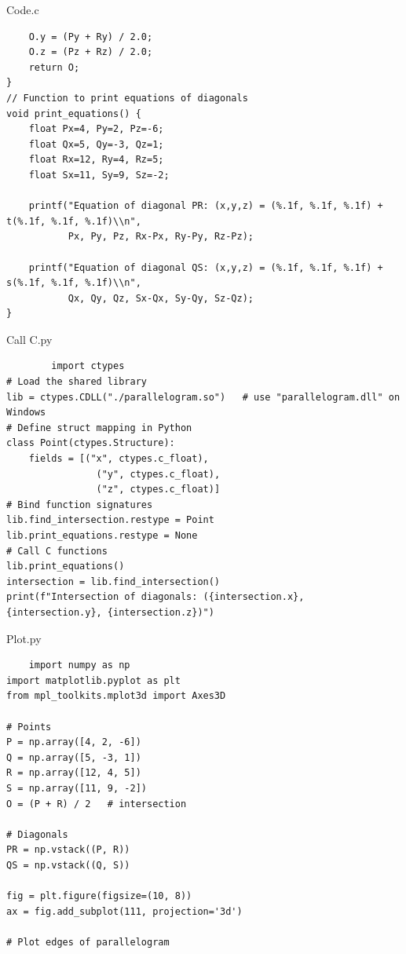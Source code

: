 \documentclass{beamer}
\begin{document}
\begin{frame}[fragile]{Code.c}
    \begin{lstlisting}
    O.y = (Py + Ry) / 2.0;
    O.z = (Pz + Rz) / 2.0;
    return O;
}
// Function to print equations of diagonals
void print_equations() {
    float Px=4, Py=2, Pz=-6;
    float Qx=5, Qy=-3, Qz=1;
    float Rx=12, Ry=4, Rz=5;
    float Sx=11, Sy=9, Sz=-2;

    printf("Equation of diagonal PR: (x,y,z) = (%.1f, %.1f, %.1f) + t(%.1f, %.1f, %.1f)\\n",
           Px, Py, Pz, Rx-Px, Ry-Py, Rz-Pz);

    printf("Equation of diagonal QS: (x,y,z) = (%.1f, %.1f, %.1f) + s(%.1f, %.1f, %.1f)\\n",
           Qx, Qy, Qz, Sx-Qx, Sy-Qy, Sz-Qz);
}
    \end{lstlisting}
\end{frame}

\begin{frame}[fragile]{Call C.py}
    \begin{lstlisting}
        import ctypes
# Load the shared library
lib = ctypes.CDLL("./parallelogram.so")   # use "parallelogram.dll" on Windows
# Define struct mapping in Python
class Point(ctypes.Structure):
    fields = [("x", ctypes.c_float),
                ("y", ctypes.c_float),
                ("z", ctypes.c_float)]
# Bind function signatures
lib.find_intersection.restype = Point
lib.print_equations.restype = None
# Call C functions
lib.print_equations()
intersection = lib.find_intersection()
print(f"Intersection of diagonals: ({intersection.x}, {intersection.y}, {intersection.z})")
    \end{lstlisting}
\end{frame}

\begin{frame}[fragile]{Plot.py}
\begin{lstlisting}
    import numpy as np
import matplotlib.pyplot as plt
from mpl_toolkits.mplot3d import Axes3D

# Points
P = np.array([4, 2, -6])
Q = np.array([5, -3, 1])
R = np.array([12, 4, 5])
S = np.array([11, 9, -2])
O = (P + R) / 2   # intersection

# Diagonals
PR = np.vstack((P, R))
QS = np.vstack((Q, S))

fig = plt.figure(figsize=(10, 8))
ax = fig.add_subplot(111, projection='3d')

# Plot edges of parallelogram
 \end{lstlisting}
\end{frame}
\end{document}
